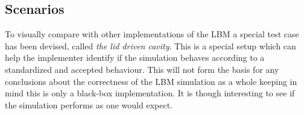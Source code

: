 \subsection{Scenarios}
To visually compare with other implementations of the LBM a special test case has been devised, called \emph{the lid driven cavity}. This is a special setup which can help the implementer identify if the simulation behaves according to a standardized and accepted behaviour. This will not form the basis for any conclusions about the correctness of the LBM simulation as a whole keeping in mind this is only a black-box implementation. It is though interesting to see if the simulation performs as one would expect.